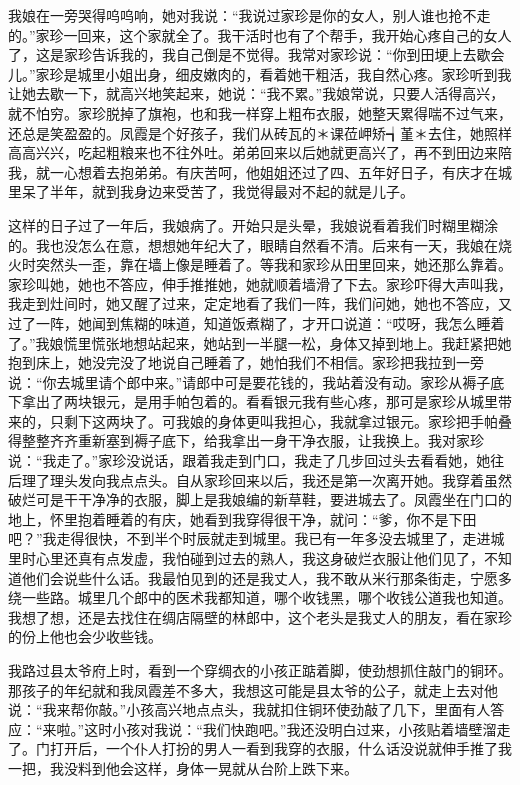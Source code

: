 \documentclass[12pt,UTF8]{ctexbook}
\begin{document}
我娘在一旁哭得呜呜响，她对我说：“我说过家珍是你的女人，别人谁也抢不走的。”家珍一回来，这个家就全了。我干活时也有了个帮手，我开始心疼自己的女人了，这是家珍告诉我的，我自己倒是不觉得。我常对家珍说：“你到田埂上去歇会儿。”家珍是城里小姐出身，细皮嫩肉的，看着她干粗活，我自然心疼。家珍听到我让她去歇一下，就高兴地笑起来，她说：“我不累。”我娘常说，只要人活得高兴，就不怕穷。家珍脱掉了旗袍，也和我一样穿上粗布衣服，她整天累得喘不过气来，还总是笑盈盈的。凤霞是个好孩子，我们从砖瓦的＊课莅岬矫┪堇＊去住，她照样高高兴兴，吃起粗粮来也不往外吐。弟弟回来以后她就更高兴了，再不到田边来陪我，就一心想着去抱弟弟。有庆苦呵，他姐姐还过了四、五年好日子，有庆才在城里呆了半年，就到我身边来受苦了，我觉得最对不起的就是儿子。

这样的日子过了一年后，我娘病了。开始只是头晕，我娘说看着我们时糊里糊涂的。我也没怎么在意，想想她年纪大了，眼睛自然看不清。后来有一天，我娘在烧火时突然头一歪，靠在墙上像是睡着了。等我和家珍从田里回来，她还那么靠着。家珍叫她，她也不答应，伸手推推她，她就顺着墙滑了下去。家珍吓得大声叫我，我走到灶间时，她又醒了过来，定定地看了我们一阵，我们问她，她也不答应，又过了一阵，她闻到焦糊的味道，知道饭煮糊了，才开口说道：“哎呀，我怎么睡着了。”我娘慌里慌张地想站起来，她站到一半腿一松，身体又掉到地上。我赶紧把她抱到床上，她没完没了地说自己睡着了，她怕我们不相信。家珍把我拉到一旁说：“你去城里请个郎中来。”请郎中可是要花钱的，我站着没有动。家珍从褥子底下拿出了两块银元，是用手帕包着的。看看银元我有些心疼，那可是家珍从城里带来的，只剩下这两块了。可我娘的身体更叫我担心，我就拿过银元。家珍把手帕叠得整整齐齐重新塞到褥子底下，给我拿出一身干净衣服，让我换上。我对家珍说：“我走了。”家珍没说话，跟着我走到门口，我走了几步回过头去看看她，她往后理了理头发向我点点头。自从家珍回来以后，我还是第一次离开她。我穿着虽然破烂可是干干净净的衣服，脚上是我娘编的新草鞋，要进城去了。凤霞坐在门口的地上，怀里抱着睡着的有庆，她看到我穿得很干净，就问：“爹，你不是下田吧？”我走得很快，不到半个时辰就走到城里。我已有一年多没去城里了，走进城里时心里还真有点发虚，我怕碰到过去的熟人，我这身破烂衣服让他们见了，不知道他们会说些什么话。我最怕见到的还是我丈人，我不敢从米行那条街走，宁愿多绕一些路。城里几个郎中的医术我都知道，哪个收钱黑，哪个收钱公道我也知道。我想了想，还是去找住在绸店隔壁的林郎中，这个老头是我丈人的朋友，看在家珍的份上他也会少收些钱。

我路过县太爷府上时，看到一个穿绸衣的小孩正踮着脚，使劲想抓住敲门的铜环。那孩子的年纪就和我凤霞差不多大，我想这可能是县太爷的公子，就走上去对他说：“我来帮你敲。”小孩高兴地点点头，我就扣住铜环使劲敲了几下，里面有人答应：“来啦。”这时小孩对我说：“我们快跑吧。”我还没明白过来，小孩贴着墙壁溜走了。门打开后，一个仆人打扮的男人一看到我穿的衣服，什么话没说就伸手推了我一把，我没料到他会这样，身体一晃就从台阶上跌下来。
\end{document}
